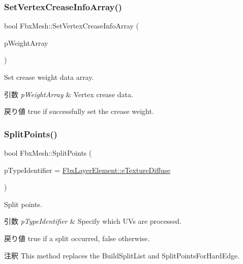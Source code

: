 \subsubsection{\texorpdfstring{Set\+Vertex\+Crease\+Info\+Array()}{SetVertexCreaseInfoArray()}}
{\footnotesize\ttfamily bool Fbx\+Mesh\+::\+Set\+Vertex\+Crease\+Info\+Array (\begin{DoxyParamCaption}\item[{\hyperlink{class_fbx_array}{Fbx\+Array}$<$ double $>$ $\ast$}]{p\+Weight\+Array }\end{DoxyParamCaption})}

Set crease weight data array. 
\begin{DoxyParams}{引数}
{\em p\+Weight\+Array} & Vertex crease data. \\
\hline
\end{DoxyParams}
\begin{DoxyReturn}{戻り値}
{\ttfamily true} if successfully set the crease weight. 
\end{DoxyReturn}
\mbox{\label{class_fbx_mesh_a3b2104f5d0942fd1e74bc62ec1bc4d52}} 
\subsubsection{\texorpdfstring{Split\+Points()}{SplitPoints()}}
{\footnotesize\ttfamily bool Fbx\+Mesh\+::\+Split\+Points (\begin{DoxyParamCaption}\item[{\hyperlink{class_fbx_layer_element_a8c95c5cd880b56c776acd379bd86f42c}{Fbx\+Layer\+Element\+::\+E\+Type}}]{p\+Type\+Identifier = {\ttfamily \hyperlink{class_fbx_layer_element_a8c95c5cd880b56c776acd379bd86f42ca09829e6ecf512e7ae04d9ad8de1342fa}{Fbx\+Layer\+Element\+::e\+Texture\+Diffuse}} }\end{DoxyParamCaption})}

Split points. 
\begin{DoxyParams}{引数}
{\em p\+Type\+Identifier} & Specify which U\+Vs are processed. \\
\hline
\end{DoxyParams}
\begin{DoxyReturn}{戻り値}
{\ttfamily true} if a split occurred, false otherwise. 
\end{DoxyReturn}
\begin{DoxyRemark}{注釈}
This method replaces the Build\+Split\+List and Split\+Points\+For\+Hard\+Edge. 
\end{DoxyRemark}


